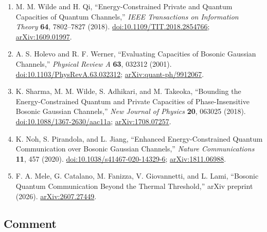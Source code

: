 \begin{enumerate}[label={},leftmargin=4.8em,labelsep=0.5em]
  \footnotesize
  \item[\textup{[WQ18]}]\label{ref:p51-wilde-qi}
  M. M. Wilde and H. Qi,
  ``Energy-Constrained Private and Quantum Capacities of Quantum Channels,''
  \emph{IEEE Transactions on Information Theory} \textbf{64}, 7802--7827
  (2018).
  \href{https://doi.org/10.1109/TIT.2018.2854766}%
       {doi:10.1109/TIT.2018.2854766};
  \href{https://arxiv.org/abs/1609.01997}{arXiv:1609.01997}.

  \item[\textup{[HW01]}]\label{ref:p51-holevo-werner}
  A. S. Holevo and R. F. Werner,
  ``Evaluating Capacities of Bosonic Gaussian Channels,''
  \emph{Physical Review A} \textbf{63}, 032312 (2001).
  \href{https://doi.org/10.1103/PhysRevA.63.032312}%
       {doi:10.1103/PhysRevA.63.032312};
  \href{https://arxiv.org/abs/quant-ph/9912067}{arXiv:quant-ph/9912067}.

  \item[\textup{[SWA+18]}]\label{ref:p51-sharma-et-al}
  K. Sharma, M. M. Wilde, S. Adhikari, and M. Takeoka,
  ``Bounding the Energy-Constrained Quantum and Private Capacities of
  Phase-Insensitive Bosonic Gaussian Channels,''
  \emph{New Journal of Physics} \textbf{20}, 063025 (2018).
  \href{https://doi.org/10.1088/1367-2630/aac11a}%
       {doi:10.1088/1367-2630/aac11a};
  \href{https://arxiv.org/abs/1708.07257}{arXiv:1708.07257}.

  \item[\textup{[NPJ20]}]\label{ref:p51-noh-pirandola-jiang}
  K. Noh, S. Pirandola, and L. Jiang,
  ``Enhanced Energy-Constrained Quantum Communication over Bosonic Gaussian
  Channels,'' \emph{Nature Communications} \textbf{11}, 457 (2020).
  \href{https://doi.org/10.1038/s41467-020-14329-6}%
       {doi:10.1038/s41467-020-14329-6};
  \href{https://arxiv.org/abs/1811.06988}{arXiv:1811.06988}.

  \item[\textup{[MCF+26]}]\label{ref:p51-mele-et-al}
  F. A. Mele, G. Catalano, M. Fanizza, V. Giovannetti, and L. Lami,
  ``Bosonic Quantum Communication Beyond the Thermal Threshold,''
  arXiv preprint (2026).
  \href{https://arxiv.org/abs/2607.27449}{arXiv:2607.27449}.
\end{enumerate}

\subsection*{Comment}

